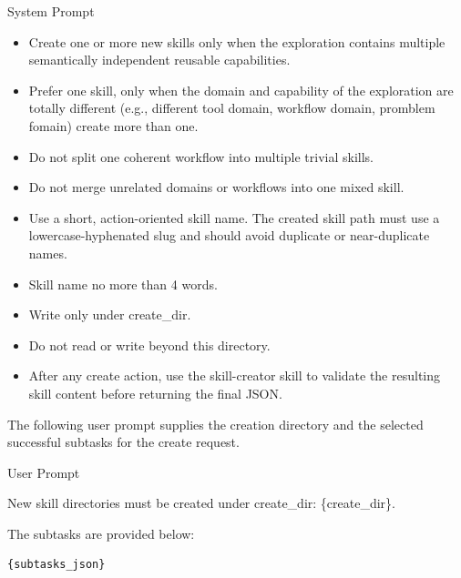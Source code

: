 \documentclass{llmxive}
\providecommand{\svpromptheading}[1]{\par\smallskip\noindent{\sffamily\bfseries#1}\par}
\providecommand{\svinlinecode}[1]{{\ttfamily #1}}
\begin{document}
\begin{svpromptbox}{System Prompt}
\begin{itemize}
\item Create one or more new skills only when the exploration contains multiple semantically independent reusable capabilities.
\item Prefer one skill, only when the domain and capability of the exploration are totally different (e.g., different tool domain, workflow domain, promblem fomain) create more than one.
\item Do not split one coherent workflow into multiple trivial skills.
\item Do not merge unrelated domains or workflows into one mixed skill.
\item Use a short, action-oriented skill name. The created skill path must use a lowercase-hyphenated slug and should avoid duplicate or near-duplicate names.
\item Skill name no more than 4 words.
\end{itemize}
\smallskip
\svpromptheading{Constraint}
\smallskip
\begin{itemize}
\item Write only under \svinlinecode{create\_dir}.
\item Do not read or write beyond this directory.
\item After any create action, use the \svinlinecode{skill-creator} skill to validate the resulting skill content before returning the final JSON.
\end{itemize}

\end{svpromptbox}

\noindent The following user prompt supplies the creation directory and the selected successful subtasks for the create request.\par

\begin{svpromptbox}{User Prompt}

New skill directories must be created under \svinlinecode{create\_dir: \{create\_dir\}}.\par
\smallskip
The subtasks are provided below:\par
\smallskip
\begin{lstlisting}[style=svpromptcode]
{subtasks_json}
\end{lstlisting}

\end{svpromptbox}
\end{document}
